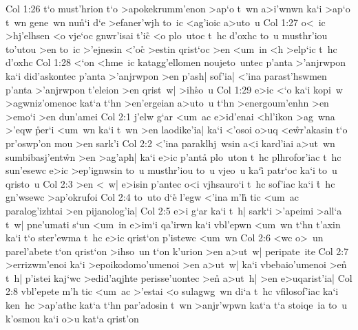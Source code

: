 \vs Col 1:26
t`o
must'hrion
t`o
>apokekrumm'enon
>ap`o
t~wn
a>i'wnwn
ka`i
>ap`o
t~wn
gene~wn
nu\r{n}`i
d`e
>efaner'wjh
to~ic
<ag'ioic
a>uto~u\bibvsend
\vs Col 1:27
o<~ic
>hj'elhsen
<o
vje`oc
gnwr'isai
t'ic\r{}
<o
plo~utoc
t~hc
d'oxhc
to~u
musthr'iou
to'utou
>en
to~ic
>'ejnesin
<'o\r{c}
>estin
qrist`oc
>en
<um~in
<h
>elp`ic
t~hc
d'oxhc\bibvsend
\vs Col 1:28
<`on
<hme~ic
katagg'ellomen
noujeto~untec
p'anta
>'anjrwpon
ka`i
did'askontec
p'anta
>'anjrwpon
>en
p'ash|
sof'ia|
<'ina
parast'hswmen
p'anta
>'anjrwpon
t'eleion
>en
qrist~w|
>ih\r{s}o~u\bibvsend
{}
\vs Col 1:29
e>ic
<`o
ka`i
kopi~w
>agwniz'omenoc
kat`a
t`hn
>en'ergeian
a>uto~u
t`hn
>energoum'enhn
>en
>emo`i
>en
dun'amei\bibvsend
\vs Col 2:1
j'elw
g`ar
<um~ac
e>id'enai
<hl'ikon
>ag~wna
>'eqw
\r{p}er`i
<um~wn
ka`i
t~wn
>en
laodike'ia|
ka`i
<'osoi
o>uq
<e\r{w}r'akasin
t`o
pr'oswp'on
mou
>en
sark'i\bibvsend
\vs Col 2:2
<'ina
paraklhj~wsin
a<i
kard'iai
a>ut~wn
sumbibasj'ent\r{w}n
>en
>ag'aph|
ka`i
e>ic
p'anta\r{}
plo~uton
t~hc
plhrofor'iac
t~hc
sun'esewc
e>ic
>ep'ignwsin
to~u
musthr'iou
to~u
vjeo~u
ka`i\r{}
patr`oc
ka`i
to~u
qristo~u\bibvsend
\vs Col 2:3
>en
<~w|
e>isin
p'antec
o<i
vjhsauro`i
t~hc
sof'iac
ka`i
\r{t}~hc
gn'wsewc
>ap'okrufoi\bibvsend
\vs Col 2:4
to~uto
d`e\r{}
l'egw
<'ina
m'h\r{}
tic
<um~ac
paralog'izhtai
>en
pijanolog'ia|\bibvsend
\vs Col 2:5
e>i
g`ar
ka`i
t~h|
sark`i
>'apeimi
>all`a
t~w|
pne'umati
s`un
<um~in
e>im`i
qa'irwn
ka`i
vbl'epwn
<um~wn
t`hn
t'axin
ka`i
t`o
ster'ewma
t~hc
e>ic
qrist`on
p'istewc
<um~wn\bibvsend
\vs Col 2:6
<wc
o>~un
parel'abete
t`on
qrist`on
>ihso~un
t`on
k'urion
>en
a>ut~w|
peripate~ite\bibvsend
\vs Col 2:7
>errizwm'enoi
ka`i
>epoikodomo'umenoi
>en
a>ut~w|
ka`i
vbebaio'umenoi
>e\r{n}
t~h|
p'istei
kaj`wc
>edid'aqjhte
perisse'uontec
>en\r{}
a>ut~h|
>en
e>uqarist'ia|\bibvsend
\vs Col 2:8
vbl'epete
m'h
tic
<um~ac
>'estai
<o
sulagwg~wn
di`a
t~hc
vfilosof'iac
ka`i
ken~hc
>ap'athc
kat`a
t`hn
par'adosin
t~wn
>anjr'wpwn
kat`a
t`a
stoiqe~ia
to~u
k'osmou
ka`i
o>u
kat`a
qrist'on\bibvsend
